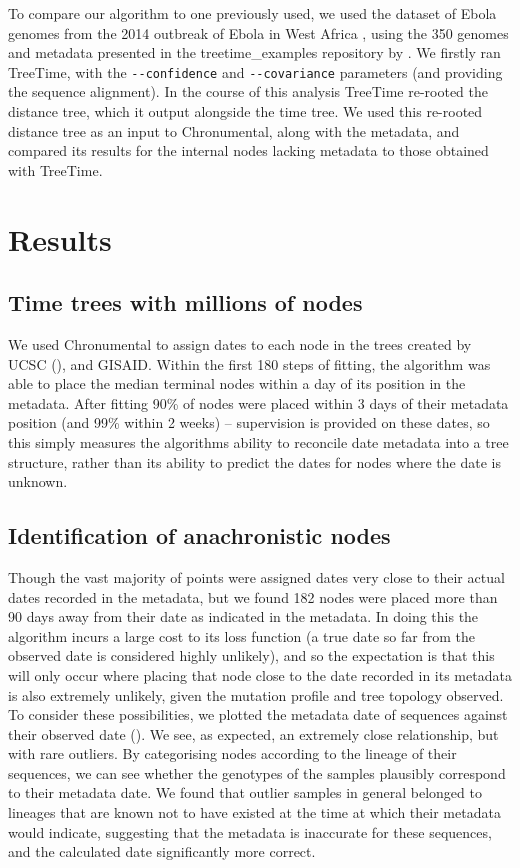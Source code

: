 To compare our algorithm to one previously used, we used the dataset of Ebola genomes from the 2014 outbreak of Ebola in West Africa  \citep{Dudas2017-km}, using the 350 genomes and metadata presented in the treetime\_examples repository by \citet{Sagulenko2018-kr}. We firstly ran TreeTime, with the \texttt{-{}-confidence} and \texttt{-{}-covariance} parameters (and providing the sequence alignment). In the course of this analysis TreeTime re-rooted the distance tree, which it output alongside the time tree. We used this re-rooted distance tree as an input to Chronumental, along with the metadata, and compared its results for the internal nodes lacking metadata to those obtained with TreeTime.


\section*{Results}



\subsection*{Time trees with millions of nodes}

We used Chronumental to assign dates to each node in the trees created by UCSC (), and GISAID. Within the first 180 steps of fitting, the algorithm was able to place the median terminal nodes within a day of its position in the metadata. After fitting 90\% of nodes were placed within 3 days of their metadata position (and 99\% within 2 weeks) -- supervision is provided on these dates, so this simply measures the algorithms ability to reconcile date metadata into a tree structure, rather than its ability to predict the dates for nodes where the date is unknown.


\subsection*{Identification of anachronistic nodes}

Though the vast majority of points were assigned dates very close to their actual dates recorded in the metadata, but we found 182 nodes were placed more than 90 days away from their date as indicated in the metadata. In doing this the algorithm incurs a large cost to its loss function (a true date so far from the observed date is considered highly unlikely), and so the expectation is that this will only occur where placing that node close to the date recorded in its metadata is also extremely unlikely, given the mutation profile and tree topology observed. To consider these possibilities, we plotted the metadata date of sequences against their observed date (). We see, as expected, an extremely close relationship, but with rare outliers. By categorising nodes according to the lineage of their sequences, we can see whether the genotypes of the samples plausibly correspond to their metadata date. We found that outlier samples in general belonged to lineages that are known not to have existed at the time at which their metadata would indicate, suggesting that the metadata is inaccurate for these sequences, and the calculated date significantly more correct. 

